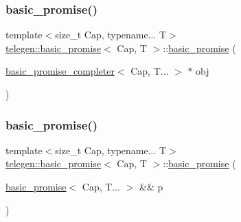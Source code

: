 \mbox{\label{classtelegen_1_1basic__promise_a6ac5ae1e598293c22075b8bd9b87bc6b}} 
\subsubsection{\texorpdfstring{basic\+\_\+promise()}{basic\_promise()}\hspace{0.1cm}{\footnotesize\ttfamily [3/5]}}
{\footnotesize\ttfamily template$<$size\+\_\+t Cap, typename... T$>$ \\
\hyperlink{classtelegen_1_1basic__promise}{telegen\+::basic\+\_\+promise}$<$ Cap, T $>$\+::\hyperlink{classtelegen_1_1basic__promise}{basic\+\_\+promise} (\begin{DoxyParamCaption}\item[{\hyperlink{classtelegen_1_1basic__promise__completer}{basic\+\_\+promise\+\_\+completer}$<$ Cap, T... $>$ $\ast$}]{obj }\end{DoxyParamCaption})\hspace{0.3cm}{\ttfamily [inline]}}

\mbox{\label{classtelegen_1_1basic__promise_a0c1f0ae0a200d107a8ab62afb48e6ffd}} 
\subsubsection{\texorpdfstring{basic\+\_\+promise()}{basic\_promise()}\hspace{0.1cm}{\footnotesize\ttfamily [4/5]}}
{\footnotesize\ttfamily template$<$size\+\_\+t Cap, typename... T$>$ \\
\hyperlink{classtelegen_1_1basic__promise}{telegen\+::basic\+\_\+promise}$<$ Cap, T $>$\+::\hyperlink{classtelegen_1_1basic__promise}{basic\+\_\+promise} (\begin{DoxyParamCaption}\item[{\hyperlink{classtelegen_1_1basic__promise}{basic\+\_\+promise}$<$ Cap, T... $>$ \&\&}]{p }\end{DoxyParamCaption})\hspace{0.3cm}{\ttfamily [inline]}}

